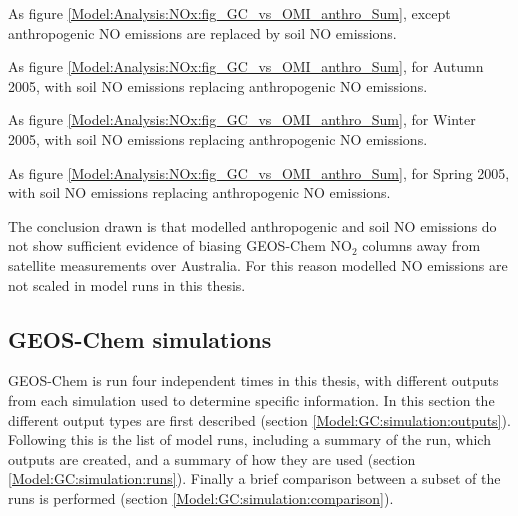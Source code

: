     {As figure \ref{Model:Analysis:NOx:fig_GC_vs_OMI_anthro_Sum}, except anthropogenic NO emissions are replaced by soil NO emissions.}
    {\label{Model:Analysis:NOx:fig_GC_vs_OMI_soil_Sum}}
    
    {As figure \ref{Model:Analysis:NOx:fig_GC_vs_OMI_anthro_Sum}, for Autumn 2005, with soil NO emissions replacing anthropogenic NO emissions.}
    {\label{Model:Analysis:NOx:fig_GC_vs_OMI_soil_Aut}}
    
    {As figure \ref{Model:Analysis:NOx:fig_GC_vs_OMI_anthro_Sum}, for Winter 2005, with soil NO emissions replacing anthropogenic NO emissions.}
    {\label{Model:Analysis:NOx:fig_GC_vs_OMI_soil_Win}}
    
    {As figure \ref{Model:Analysis:NOx:fig_GC_vs_OMI_anthro_Sum}, for Spring 2005, with soil NO emissions replacing anthropogenic NO emissions.}
    {\label{Model:Analysis:NOx:fig_GC_vs_OMI_soil_Spr}}
    
    The conclusion drawn is that modelled anthropogenic and soil NO emissions do not show sufficient evidence of biasing GEOS-Chem NO$_2$ columns away from satellite measurements over Australia.
    For this reason modelled NO emissions are not scaled in model runs in this thesis.
  

  \subsection{GEOS-Chem simulations}
    \label{Model:GC:simulation}
    
    GEOS-Chem is run four independent times in this thesis, with different outputs from each simulation used to determine specific information. 
    In this section the different output types are first described (section \ref{Model:GC:simulation:outputs}).
    Following this is the list of model runs, including a summary of the run, which outputs are created, and a summary of how they are used (section \ref{Model:GC:simulation:runs}).
    Finally a brief comparison between a subset of the runs is performed (section \ref{Model:GC:simulation:comparison}).
    
